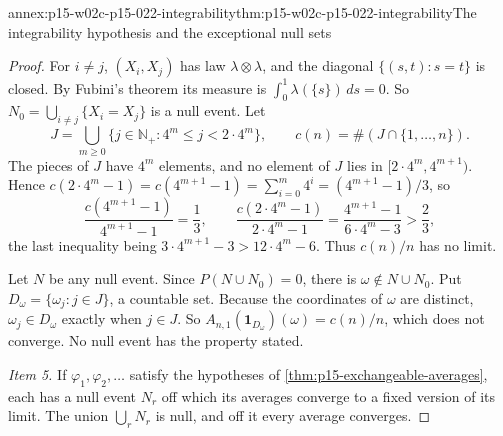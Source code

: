 \begin{annexitem}{annex:p15-w02c-p15-022-integrability}{thm:p15-w02c-p15-022-integrability}{The integrability hypothesis and the exceptional null sets}
\begin{proof}
For \(i\neq j\), \((X_i,X_j)\) has law \(\lambda\otimes\lambda\), and the
diagonal \(\{(s,t):s=t\}\) is closed. By Fubini's theorem its measure is
\(\int_0^1\lambda(\{s\})\,ds=0\). So
\(N_0=\bigcup_{i\neq j}\{X_i=X_j\}\) is a null event. Let
\[
 J=\bigcup_{m\geq0}\{j\in\mathbb N_+:4^m\leq j<2\cdot4^m\},
 \qquad c(n)=\#(J\cap\{1,\ldots,n\}).
\]
The pieces of \(J\) have \(4^m\) elements, and no element of \(J\) lies in
\([2\cdot4^m,4^{m+1})\). Hence
\(c(2\cdot4^m-1)=c(4^{m+1}-1)=\sum_{i=0}^m4^i=(4^{m+1}-1)/3\), so
\[
 \frac{c(4^{m+1}-1)}{4^{m+1}-1}=\frac13,
 \qquad
 \frac{c(2\cdot4^m-1)}{2\cdot4^m-1}=\frac{4^{m+1}-1}{6\cdot4^m-3}>\frac23,
\]
the last inequality being \(3\cdot4^{m+1}-3>12\cdot4^m-6\). Thus
\(c(n)/n\) has no limit.

Let \(N\) be any null event. Since \(P(N\cup N_0)=0\), there is
\(\omega\notin N\cup N_0\). Put \(D_\omega=\{\omega_j:j\in J\}\), a
countable set. Because the coordinates of \(\omega\) are distinct,
\(\omega_j\in D_\omega\) exactly when \(j\in J\). So
\(A_{n,1}(\mathbf1_{D_\omega})(\omega)=c(n)/n\), which does not converge.
No null event has the property stated.

\emph{Item 5.} If \(\varphi_1,\varphi_2,\ldots\) satisfy the hypotheses
of \cref{thm:p15-exchangeable-averages}, each has a null event \(N_r\)
off which its averages converge to a fixed version of its limit. The
union \(\bigcup_rN_r\) is null, and off it every average converges.
\end{proof}
\end{annexitem}


